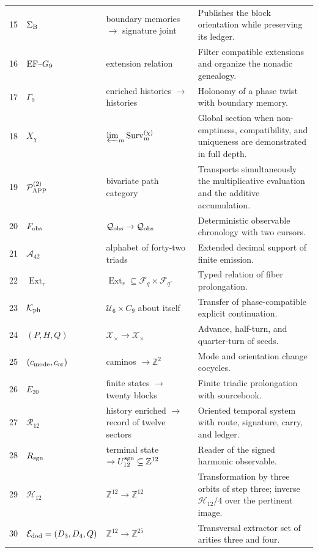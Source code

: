 \begin{longtable}{@{}r p{}p{}p{}@{}}
15&\(\Sigma_{\rm B}\)&boundary memories \(\to\) signature joint&
Publishes the block orientation while preserving its ledger.\\
16&\({\rm EF}\text{--}G_9\)&extension relation&
Filter compatible extensions and organize the nonadic genealogy.\\
17&\(\Gamma_9\)&enriched histories \(\longrightarrow\) histories&
Holonomy of a phase twist with boundary memory.\\
18&\(X_\chi\)&\(\varprojlim_m\operatorname{Surv}^{(\chi)}_m\)&
Global section when non-emptiness, compatibility, and uniqueness are demonstrated in full depth.\\
19&\(\mathcal P_{\rm APP}^{(2)}\)&bivariate path category&
Transports simultaneously the multiplicative evaluation and the additive accumulation.\\
20&\(F_{\rm obs}\)&\(\mathcal Q_{\rm obs}\to\mathcal Q_{\rm obs}\)&
Deterministic observable chronology with two cursors.\\
21&\(\mathcal A_{42}\)&alphabet of forty-two triads&
Extended decimal support of finite emission.\\
22&\(\operatorname{Ext}_r\)&
\(\operatorname{Ext}_r\subseteq\mathcal F_q\times\mathcal F_{q'}\)&
Typed relation of fiber prolongation.\\
23&\(\mathcal K_{\rm ph}\)&\(\mathcal U_6\times C_9\) about itself&
Transfer of phase-compatible explicit continuation.\\
24&\((P,H,Q)\)&\(\mathcal X_\times\to\mathcal X_\times\)&
Advance, half-turn, and quarter-turn of seeds.\\
25&\((c_{\rm mode},c_{\rm or})\)&caminos \(\to\mathbb Z^2\)&
Mode and orientation change cocycles.\\
26&\(E_{20}\)&finite states \(\to\) twenty blocks&
Finite triadic prolongation with sourcebook.\\
27&\(\mathcal R_{12}\)&history enriched \(\to\) record of twelve
sectors&
Oriented temporal system with route, signature, carry, and ledger.\\
28&\(R_{\rm sgn}\)&terminal state \(\to U_{12}^{\rm sgn}
\subseteq\mathbb Z^{12}\)&
Reader of the signed harmonic observable.\\
29&\(\mathcal H_{12}\)&\(\mathbb Z^{12}\to\mathbb Z^{12}\)&
Transformation by three orbits of step three; inverse
\(\mathcal H_{12}/4\) over the pertinent image.\\
30&\(\mathcal E_{\rm dod}=(D_3,D_4,Q)\)&
\(\mathbb Z^{12}\to\mathbb Z^{25}\)&
Transversal extractor set of arities three and four.\\

\end{longtable}
